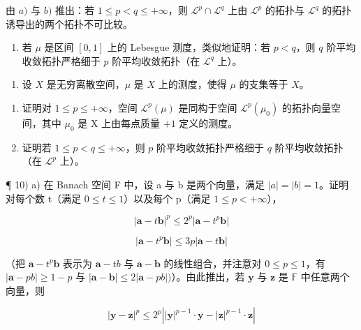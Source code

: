 由 \(a)\) 与 \(b)\) 推出：若 \(1 \leqslant p < q \leqslant +\infty\)，则 \(\mathcal{L}^p \cap \mathcal{L}^q\) 上由 \(\mathcal{L}^p\) 的拓扑与 \(\mathcal{L}^q\) 的拓扑诱导出的两个拓扑不可比较。

\begin{enumerate}
\def\labelenumi{\alph{enumi})}
\setcounter{enumi}{2}
\tightlist
\item
  若 \(\mu\) 是区间 \([0,1]\) 上的 Lebesgue 测度，类似地证明：若 \(p < q\)，则 \(q\) 阶平均收敛拓扑严格细于 \(p\) 阶平均收敛拓扑（在 \(\mathcal{L}^q\) 上）。
\end{enumerate}

\begin{enumerate}
\def\labelenumi{\arabic{enumi})}
\setcounter{enumi}{8}
\tightlist
\item
  设 \(X\) 是无穷离散空间，\(\mu\) 是 \(X\) 上的测度，使得 \(\mu\) 的支集等于 \(X\)。
\end{enumerate}

\begin{enumerate}
\def\labelenumi{\alph{enumi})}
\item
  证明对 \(1 \leqslant p \leqslant +\infty\)，空间 \(\mathcal{L}^p(\mu)\) 是同构于空间 \(\mathcal{L}^p(\mu_0)\) 的拓扑向量空间，其中 \(\mu_0\) 是 X 上由每点质量 \(+1\) 定义的测度。
\item
  证明若 \(1 \leqslant p < q \leqslant +\infty\)，则 \(p\) 阶平均收敛拓扑严格细于 \(q\) 阶平均收敛拓扑（在 \(\mathcal{L}^p\) 上）。
\end{enumerate}

¶ 10) a) 在 Banach 空间 F 中，设 a 与 b 是两个向量，满足 \(|a| = |b| = 1\)。证明对每个数 t（满足 \(0 \leqslant t \leqslant 1\)）以及每个 p（满足 \(1 \leqslant p < +\infty\)），

\[
| \mathbf {a} - t \mathbf {b} | ^ {p} \leqslant 2 ^ {p} | \mathbf {a} - t ^ {p} \mathbf {b} |\tag{1}
\]

\[
| \mathbf {a} - t ^ {p} \mathbf {b} | \leqslant 3 p | \mathbf {a} - t \mathbf {b} |\tag{2}
\]

（把 \(\mathbf{a} - t^{p}\mathbf{b}\) 表示为 \(\mathbf{a} - tb\) 与 \(\mathbf{a} - \mathbf{b}\) 的线性组合，并注意对 \(0\leqslant p\leqslant 1\)，有 \(|\mathbf{a} - pb|\geqslant 1 - p\) 与 \(|\mathbf{a} - \mathbf{b}|\leqslant 2|\mathbf{a} - pb|)\)）。由此推出，若 \(\mathbf{y}\) 与 \(\mathbf{z}\) 是 \(\mathbb{F}\) 中任意两个向量，则

\[
\left| \mathbf {y} - \mathbf {z} \right| ^ {p} \leqslant 2 ^ {p} \left| \left| \mathbf {y} \right| ^ {p - 1} \cdot \mathbf {y} - \left| \mathbf {z} \right| ^ {p - 1} \cdot \mathbf {z} \right|\tag{3}
\]

